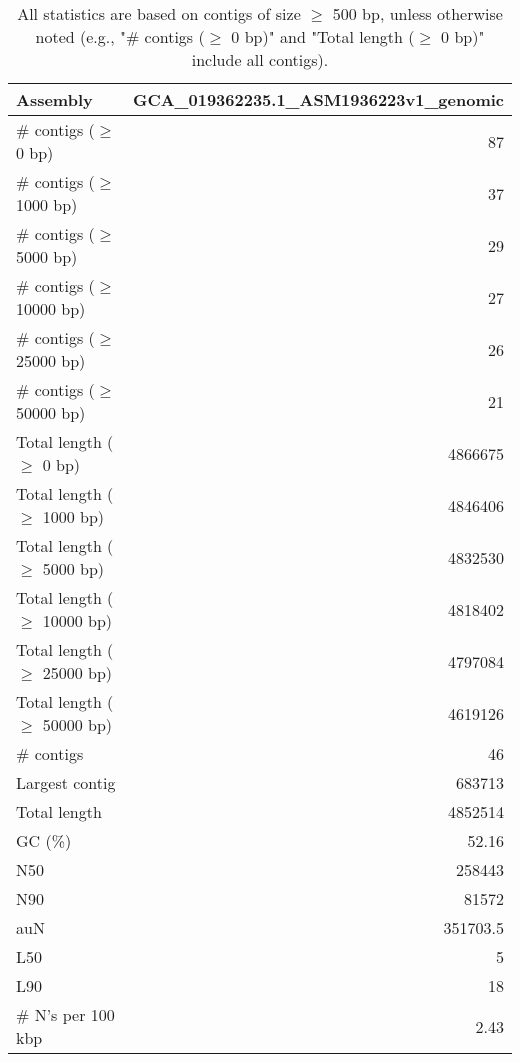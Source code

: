 \documentclass[12pt,a4paper]{article}
\begin{document}
\begin{table}[ht]
\begin{center}
\caption{All statistics are based on contigs of size $\geq$ 500 bp, unless otherwise noted (e.g., "\# contigs ($\geq$ 0 bp)" and "Total length ($\geq$ 0 bp)" include all contigs).}
\begin{tabular}{|l*{1}{|r}|}
\hline
Assembly & GCA\_019362235.1\_ASM1936223v1\_genomic \\ \hline
\# contigs ($\geq$ 0 bp) & 87 \\ \hline
\# contigs ($\geq$ 1000 bp) & 37 \\ \hline
\# contigs ($\geq$ 5000 bp) & 29 \\ \hline
\# contigs ($\geq$ 10000 bp) & 27 \\ \hline
\# contigs ($\geq$ 25000 bp) & 26 \\ \hline
\# contigs ($\geq$ 50000 bp) & 21 \\ \hline
Total length ($\geq$ 0 bp) & 4866675 \\ \hline
Total length ($\geq$ 1000 bp) & 4846406 \\ \hline
Total length ($\geq$ 5000 bp) & 4832530 \\ \hline
Total length ($\geq$ 10000 bp) & 4818402 \\ \hline
Total length ($\geq$ 25000 bp) & 4797084 \\ \hline
Total length ($\geq$ 50000 bp) & 4619126 \\ \hline
\# contigs & 46 \\ \hline
Largest contig & 683713 \\ \hline
Total length & 4852514 \\ \hline
GC (\%) & 52.16 \\ \hline
N50 & 258443 \\ \hline
N90 & 81572 \\ \hline
auN & 351703.5 \\ \hline
L50 & 5 \\ \hline
L90 & 18 \\ \hline
\# N's per 100 kbp & 2.43 \\ \hline
\end{tabular}
\end{center}
\end{table}
\end{document}
